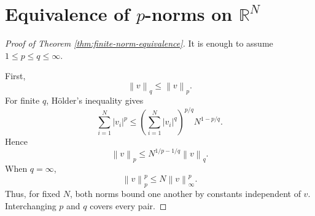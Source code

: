 \documentclass[11pt,a5paper,oneside,openany]{scrreprt}
\theoremstyle{notes}
\theoremstyle{definitions}
\newcommand{\R}{\mathbb{R}}
\newcommand{\norm}[1]{\left\lVert #1\right\rVert}
\begin{document}
\section{Equivalence of $p$-norms on $\R^N$}

\begin{proof}[Proof of Theorem \ref{thm:finite-norm-equivalence}]
It is enough to assume $1\le p\le q\le\infty$.

First,
\[
  \norm v_q\le\norm v_p.
\]
For finite $q$, H\"older's inequality gives
\[
  \sum_{i=1}^{N}|v_i|^p
  \le
  \left(\sum_{i=1}^{N}|v_i|^q\right)^{p/q}
  N^{1-p/q}.
\]
Hence
\[
  \norm v_p\le N^{1/p-1/q}\norm v_q.
\]
When $q=\infty$,
\[
  \norm v_p^p
  \le N\norm v_\infty^p.
\]
Thus, for fixed $N$, both norms bound one another by constants independent of
$v$.  Interchanging $p$ and $q$ covers every pair.
\end{proof}
\end{document}
